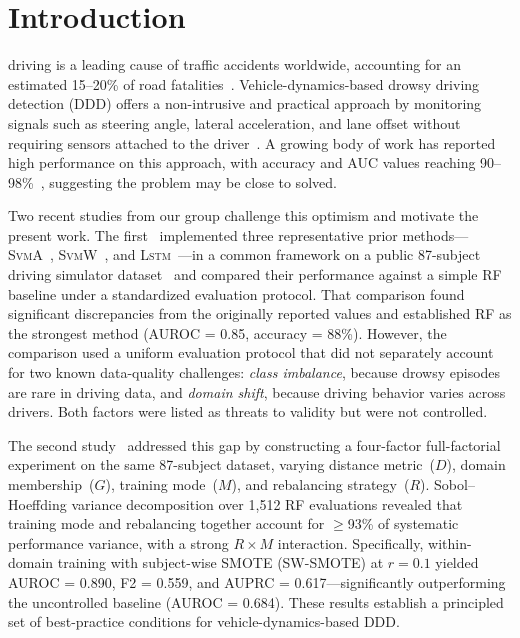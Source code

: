 \documentclass[lettersize,journal]{IEEEtran}
\newcommand{\Impl}[1]{\textsc{#1}}
\begin{document}
\section{Introduction}
\label{sec:intro}

 driving is a leading cause of traffic accidents worldwide, accounting for an estimated 15--20\% of road fatalities~\cite{who2018}.
Vehicle-dynamics-based drowsy driving detection (DDD) offers a non-intrusive and practical approach by monitoring signals such as steering angle, lateral acceleration, and lane offset without requiring sensors attached to the driver~\cite{fu2024,fonseca2025}.
A growing body of work has reported high performance on this approach, with accuracy and AUC values reaching 90--98\%~\cite{arefnezhad2019,zhao2012,wang2022}, suggesting the problem may be close to solved.

Two recent studies from our group challenge this optimism and motivate the present work.
The first~\cite{nakagama2025iv} implemented three representative prior methods---\Impl{SvmA}~\cite{arefnezhad2019}, \Impl{SvmW}~\cite{zhao2012}, and \Impl{Lstm}~\cite{wang2022}---in a common framework on a public 87-subject driving simulator dataset~\cite{aygun2024} and compared their performance against a simple RF baseline under a standardized evaluation protocol.
That comparison found significant discrepancies from the originally reported values and established RF as the strongest method (AUROC = 0.85, accuracy = 88\%).
However, the comparison used a uniform evaluation protocol that did not separately account for two known data-quality challenges: \emph{class imbalance}, because drowsy episodes are rare in driving data, and \emph{domain shift}, because driving behavior varies across drivers.
Both factors were listed as threats to validity but were not controlled.

The second study~\cite{nakagama2026tiv} addressed this gap by constructing a four-factor full-factorial experiment on the same 87-subject dataset, varying distance metric~($D$), domain membership~($G$), training mode~($M$), and rebalancing strategy~($R$).
Sobol--Hoeffding variance decomposition over 1{,}512 RF evaluations revealed that training mode and rebalancing together account for $\geq$93\% of systematic performance variance, with a strong $R \times M$ interaction.
Specifically, within-domain training with subject-wise SMOTE (SW-SMOTE) at $r = 0.1$ yielded AUROC = 0.890, F2 = 0.559, and AUPRC = 0.617---significantly outperforming the uncontrolled baseline (AUROC = 0.684).
These results establish a principled set of best-practice conditions for vehicle-dynamics-based DDD.
\end{document}
